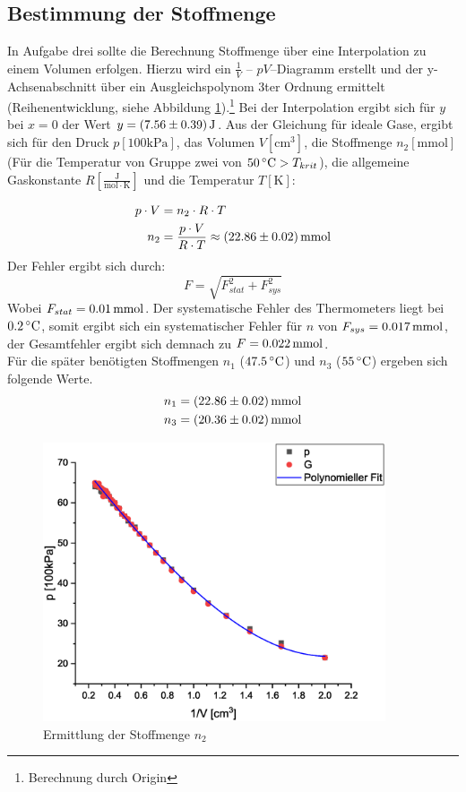 \subsection{Bestimmung der Stoffmenge} \label{sec:Stoffmenge}
In Aufgabe drei sollte die Berechnung Stoffmenge über eine Interpolation zu einem Volumen erfolgen. Hierzu wird ein $\frac{1}{V}$ -- $pV$--Diagramm erstellt und der y-Achsenabschnitt über ein Ausgleichspolynom 3ter Ordnung ermittelt (Reihenentwicklung, siehe Abbildung \ref{fig:aufgabe3}).\footnote{Berechnung durch Origin} Bei der Interpolation ergibt sich für $y$ bei $x=0$ der Wert $y=\unit[(7.56 \pm 0.39)]{J}  $. Aus der Gleichung für ideale Gase, ergibt sich für den Druck $p [\mathrm{100kPa}]$, das Volumen $V [\mathrm{cm^3}]$, die Stoffmenge $n_2 [\mathrm{mmol}]$ (Für die Temperatur von Gruppe zwei von $\unit[50]{^\circ C} > T_{krit}$), die allgemeine Gaskonstante $R [\mathrm{\frac{J}{mol \cdot K}}]$ und die Temperatur $T [\mathrm{K}]$:

\begin{align}
p \cdot V &= n_2 \cdot R \cdot T\\
n_2 &= \frac{p \cdot V}{R \cdot T} \approx \unit[(22.86 \pm 0.02)]{mmol} \notag
\end{align}
Der Fehler ergibt sich durch:
\[
F = \sqrt{F_{stat}^2 + F_{sys}^2}
\]
Wobei $F_{stat} = \unit[0.01]{mmol}$. Der systematische Fehler des Thermometers liegt bei $\unit[0.2]{^\circ C}$, somit ergibt sich ein systematischer Fehler für $n$ von $F_{sys} = \unit[0.017]{mmol}$, der Gesamtfehler ergibt sich demnach zu $F = \unit[0.022]{mmol}$. \\
Für die später benötigten Stoffmengen $n_1$ ($\unit[47.5]{^\circ C}$) und $n_3$ ($\unit[55]{^\circ C}$) ergeben sich folgende Werte.
\begin{align*}
n_1 &= \unit[(22.86 \pm 0.02)]{mmol}\\
n_3 &= \unit[(20.36 \pm 0.02)]{mmol}
\end{align*}

\begin{figure}
\includegraphics[width=0.9\textwidth]{Bilder/aufgabe_3.eps}
\caption{Ermittlung der Stoffmenge $n_2$}
\label{fig:aufgabe3}
\end{figure}
